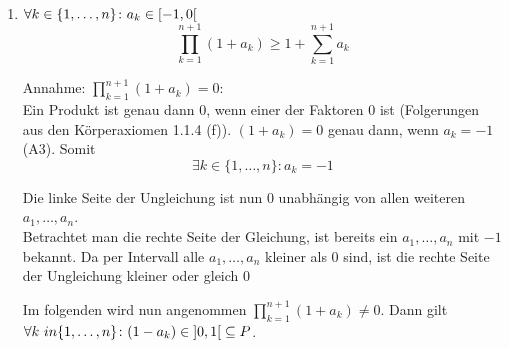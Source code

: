 \documentclass{article}
\begin{document}
\begin{enumerate}[label={Fall \arabic*}]
\item $\forall k \in \{1, \ldots, n \} \colon a_k \in \interval[open right]{-1}{0}$ \\
  \[
    \prod\limits_{k = 1}^{n+1} (1 + a_k) \geq 1 + \sum\limits_{k = 1}^{n + 1} a_k
  \]

  Annahme: $\prod\limits_{k = 1}^{n+1} (1 + a_k) = 0$: \\
    
  Ein Produkt ist genau dann $0$, wenn einer der Faktoren $0$ ist (Folgerungen aus den Körperaxiomen 1.1.4 (f)).
  $(1 + a_k) = 0$ genau dann, wenn $a_k = -1$ (A3). Somit
  \[
    \exists k \in \{1, \ldots, n \} \colon a_k = -1
  \]
  
  Die linke Seite der Ungleichung ist nun $0$ unabhängig von allen weiteren $a_1, \ldots, a_n$. \\
  
  Betrachtet man die rechte Seite der Gleichung, ist bereits ein $a_1, \ldots, a_n$ mit $-1$ bekannt.
  Da per Intervall alle $a_1, \ldots, a_n$ kleiner als $0$ sind, ist die rechte Seite der Ungleichung
  kleiner oder gleich $0$

  Im folgenden wird nun angenommen $\prod\limits_{k = 1}^{n+1} (1 + a_k) \ne 0$. Dann gilt
  $\forall k \ in \{1, \ldots, n \} \colon (1 - a_k) \in \interval[open]{0}{1} \subseteq P$.


\end{enumerate}
\end{document}

